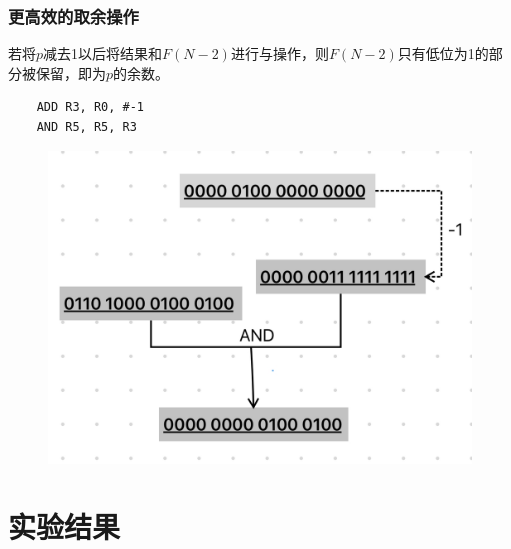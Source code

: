 \documentclass[12pt, a4paper, oneside]{ctexart}
\begin{document}
\subsubsection*{更高效的取余操作}
若将$p$减去1以后将结果和$F(N-2)$进行与操作，则$F(N-2)$只有低位为1的部分被保留，即为$p$的余数。\\
\begin{lstlisting}
    ADD R3, R0, #-1
    AND R5, R5, R3 
\end{lstlisting}
\begin{figure}[H]
    \centering
    \includegraphics[scale=0.3]{quyu.png}
\end{figure}
\section*{实验结果}
\end{document}
